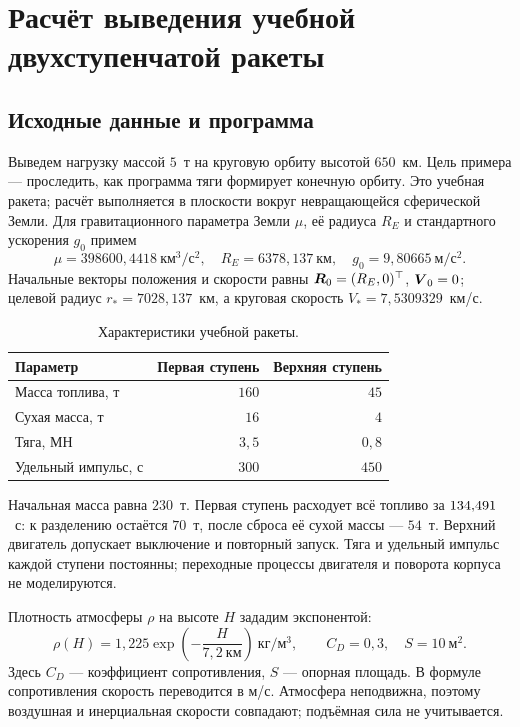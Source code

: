 \section{Расчёт выведения учебной двухступенчатой ракеты}
\label{sec:numerical-ascent}


\subsection{Исходные данные и программа}

Выведем нагрузку массой $5$~т на круговую орбиту высотой $650$~км.
Цель примера --- проследить, как программа тяги формирует конечную
орбиту. Это учебная ракета; расчёт выполняется в плоскости вокруг
невращающейся сферической Земли. Для гравитационного параметра Земли
$\mu$, её радиуса $R_E$ и стандартного ускорения $g_0$ примем
\[
 \mu=398600{,}4418\ \text{км}^3/\text{с}^2,\quad
 R_E=6378{,}137\ \text{км},\quad g_0=9{,}80665\ \text{м}/\text{с}^2.
\]
Начальные векторы положения и скорости равны
$\boldsymbol{R}_0=(R_E,0)^\top$, $\boldsymbol{V}_0=0$;
целевой радиус $r_*=7028{,}137$~км, а круговая скорость
$V_*=7{,}5309329$~км/с.

\begin{table}[htbp]
\centering
\caption{Характеристики учебной ракеты.}
\label{tab:ascent-vehicle}
\renewcommand{\arraystretch}{1.12}
\begin{tabularx}{\textwidth}{@{}Xrr@{}}
\toprule
Параметр & Первая ступень & Верхняя ступень\\\midrule
Масса топлива, т & $160$ & $45$\\
Сухая масса, т & $16$ & $4$\\
Тяга, МН & $3{,}5$ & $0{,}8$\\
Удельный импульс, с & $300$ & $450$\\
\bottomrule
\end{tabularx}
\end{table}

Начальная масса равна $230$~т. Первая ступень расходует всё топливо
за $134{,}491$~с: к разделению остаётся $70$~т, после сброса
её сухой массы --- $54$~т. Верхний двигатель допускает выключение
и повторный запуск. Тяга и удельный импульс каждой ступени постоянны;
переходные процессы двигателя и поворота корпуса не моделируются.

Плотность атмосферы $\rho$ на высоте $H$ зададим экспонентой:
\begin{equation}
 \rho(H)=1{,}225\exp\left(-\frac{H}{7{,}2\ \text{км}}\right)
 \ \text{кг}/\text{м}^3,\qquad C_D=0{,}3,\quad S=10\ \text{м}^2.
 \label{eq:numerical-atmosphere}
\end{equation}
Здесь $C_D$ --- коэффициент сопротивления, $S$ --- опорная площадь.
В формуле сопротивления скорость переводится в м/с.
Атмосфера неподвижна, поэтому воздушная и инерциальная скорости
совпадают; подъёмная сила не учитывается.

